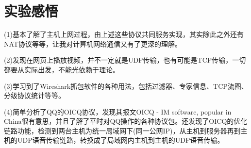 \documentclass{xjtureport}
\begin{document}
\section{实验感悟}
(1)基本了解了主机上网过程，由上述这些协议共同服务实现，其实除此之外还有NAT协议等等，让我对计算机网络通信又有了更深的理解。\par
(2)发现在网页上播放视频，并不一定就是UDP传输，也有可能是TCP传输，一切都要从实际出发，不能光依赖于理论。\par
(3)学习到了Wireshark抓包软件的各种用法，包括过滤器、专家信息、TCP流图、分级协议统计等等。\par
(4)简单分析了QQ的OICQ协议，发现其报文OICQ - IM software, popular in China很有意思，并且了解了平时对QQ操作的各种协议包。还发现了OICQ的优化链路功能，检测到两台主机为统一局域网下(同一公网IP)，从主机到服务器再到主机的UDP语音传输链路，转换成了局域网内主机到主机的UDP语音传输。
\end{document}

